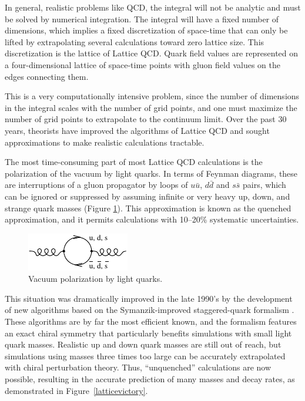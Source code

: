 \documentclass{cornell}
\begin{document}
In general, realistic problems like QCD, the integral will not be
analytic and must be solved by numerical integration.  The integral
will have a fixed number of dimensions, which implies a fixed
discretization of space-time that can only be lifted by extrapolating
several calculations toward zero lattice size.  This discretization is
the lattice of Lattice QCD.  Quark field values are represented on a
four-dimensional lattice of space-time points with gluon field values
on the edges connecting them.

This is a very computationally intensive problem, since the number of
dimensions in the integral scales with the number of grid points, and
one must maximize the number of grid points to extrapolate to the
continuum limit.  Over the past 30 years, theorists have improved the
algorithms of Lattice QCD and sought approximations to make realistic
calculations tractable.

The most time-consuming part of most Lattice QCD calculations is the
polarization of the vacuum by light quarks.  In terms of Feynman
diagrams, these are interruptions of a gluon propagator by loops of
$u\bar{u}$, $d\bar{d}$ and $s\bar{s}$ pairs, which can be ignored or
suppressed by assuming infinite or very heavy up, down, and strange
quark masses (Figure \ref{vacuumpolarization}).  This approximation is
known as the quenched approximation, and it permits calculations with
10--20\% systematic uncertainties.

\begin{figure}[t]
  \begin{center}
    \includegraphics[width=0.35\linewidth]{newplots/vacuumpolarization}
  \end{center}
  \caption[Vacuum polarization by light
  quarks]{\label{vacuumpolarization} Vacuum polarization by light
  quarks.}
\end{figure}

This situation was dramatically improved in the late 1990's by the
development of new algorithms based on the Symanzik-improved
staggered-quark formalism \cite{confronts}.  These algorithms are by
far the most efficient known, and the formalism features an exact
chiral symmetry that particularly benefits simulations with small
light quark masses.  Realistic up and down quark masses are still out
of reach, but simulations using masses three times too large can be
accurately extrapolated with chiral perturbation theory.  Thus,
``unquenched'' calculations are now possible, resulting in the
accurate prediction of many masses and decay rates, as demonstrated in
Figure~\ref{latticevictory}.
\end{document}
